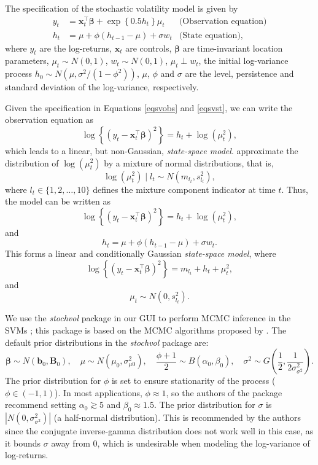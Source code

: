 The specification of the stochastic volatility model is given by
\begin{align}
	y_t&=\bm{x}_t^{\top}\bm{\beta}+\exp\left\{0.5h_t\right\}\mu_t& \text{(Observation equation)}\label{eqsvobs}\\
	h_t&=\mu+\phi(h_{t-1}-\mu)+\sigma w_t& \text{(State equation)}\label{eqsvst},
\end{align}
where $y_t$ are the log-returns, $\bm{x}_t$ are controls, $\bm{\beta}$ are time-invariant location parameters, $\mu_t\sim N(0,1)$, $w_t\sim N(0,1)$, $\mu_t\perp w_t$, the initial log-variance process $h_0\sim N(\mu, \sigma^2/(1-\phi^2))$, $\mu$, $\phi$ and $\sigma$ are the level, persistence and standard deviation of the log-variance, respectively.

Given the specification in Equations \ref{eqsvobs} and \ref{eqsvst}, we can write the observation equation as 
\[
\log\left\{(y_t-\bm{x}_t^{\top}\bm{\beta})^2\right\} = h_t + \log(\mu_t^2),
\]
which leads to a linear, but non-Gaussian, \textit{state-space model}. \cite{kastner2014ancillarity} approximate the distribution of $\log(\mu_t^2)$ by a mixture of normal distributions, that is, 
\[
\log(\mu_t^2)\mid l_t \sim N(m_{l_t},s_{l_t}^2),
\]
where $l_t \in \{1, 2, \dots, 10\}$ defines the mixture component indicator at time $t$. Thus, the model can be written as
\[
\log\left\{(y_t-\bm{x}_t^{\top}\bm{\beta})^2\right\} = h_t + \log(\mu_t^2),
\]
and
\[
h_t = \mu + \phi(h_{t-1} - \mu) + \sigma w_t.
\]
This forms a linear and conditionally Gaussian \textit{state-space model}, where
\[
\log\left\{(y_t-\bm{x}_t^{\top}\bm{\beta})^2\right\} = m_{l_t} + h_t + \mu_t^2,
\]
and
\[
\mu_t \sim N(0, s_{l_t}^2).
\]

We use the \textit{stochvol} package in our GUI to perform MCMC inference in the SVMs \cite{hosszejni_kastner_2021}; this package is based on the MCMC algorithms proposed by \cite{kastner2014ancillarity}. The default prior distributions in the \textit{stochvol} package are: 
\[
\bm{\beta} \sim N(\bm{b}_0, \bm{B}_0), \quad \mu \sim N(\mu_0, \sigma_{\mu0}^2), \quad \frac{\phi+1}{2} \sim B(\alpha_0, \beta_0), \quad \sigma^2 \sim G\left(\frac{1}{2}, \frac{1}{2\sigma^2_{\sigma^2}}\right).
\]
The prior distribution for $\phi$ is set to ensure stationarity of the process ($\phi \in (-1,1)$). In most applications, $\phi \approx 1$, so the authors of the package recommend setting $\alpha_0 \gtrsim 5$ and $\beta_0 \approx 1.5$. The prior distribution for $\sigma$ is $ |N(0, \sigma^2_{\sigma^2})|$ (a half-normal distribution). This is recommended by the authors since the conjugate inverse-gamma distribution does not work well in this case, as it bounds $\sigma$ away from 0, which is undesirable when modeling the log-variance of log-returns.

